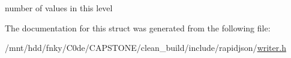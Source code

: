number of values in this level 



The documentation for this struct was generated from the following file\+:\begin{DoxyCompactItemize}
\item 
/mnt/hdd/fnky/\+C0de/\+C\+A\+P\+S\+T\+O\+N\+E/clean\+\_\+build/include/rapidjson/\hyperlink{writer_8h}{writer.\+h}\end{DoxyCompactItemize}
